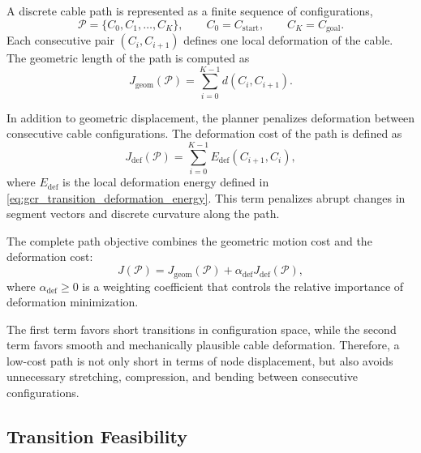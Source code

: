 \documentclass{pas}
\begin{document}
A discrete cable path is represented as a finite sequence of configurations,
\begin{equation}
\mathcal{P}
=
\{C_0,C_1,\ldots,C_K\},
\qquad
C_0=C_{\mathrm{start}},
\qquad
C_K=C_{\mathrm{goal}} .
\label{eq:discrete_cable_path}
\end{equation}
Each consecutive pair \((C_i,C_{i+1})\) defines one local deformation of the
cable. The geometric length of the path is computed as
\begin{equation}
J_{\mathrm{geom}}(\mathcal{P})
=
\sum_{i=0}^{K-1}
d(C_i,C_{i+1}).
\label{eq:path_geometric_cost}
\end{equation}

In addition to geometric displacement, the planner penalizes deformation between
consecutive cable configurations. The deformation cost of the path is defined as
\begin{equation}
J_{\mathrm{def}}(\mathcal{P})
=
\sum_{i=0}^{K-1}
E_{\mathrm{def}}(C_{i+1},C_i),
\label{eq:path_deformation_cost}
\end{equation}
where \(E_{\mathrm{def}}\) is the local deformation energy defined in
\eqref{eq:gcr_transition_deformation_energy}. This term penalizes abrupt changes in
segment vectors and discrete curvature along the path.

The complete path objective combines the geometric motion cost and the
deformation cost:
\begin{equation}
J(\mathcal{P})
=
J_{\mathrm{geom}}(\mathcal{P})
+
\alpha_{\mathrm{def}}
J_{\mathrm{def}}(\mathcal{P}),
\label{eq:complete_path_cost_objective}
\end{equation}
where \(\alpha_{\mathrm{def}}\geq 0\) is a weighting coefficient that controls
the relative importance of deformation minimization.

The first term favors short transitions in configuration space, while the second
term favors smooth and mechanically plausible cable deformation. Therefore, a
low-cost path is not only short in terms of node displacement, but also avoids
unnecessary stretching, compression, and bending between consecutive
configurations.
\subsection{Transition Feasibility}
\label{subsec:continuous_motion}
\end{document}
